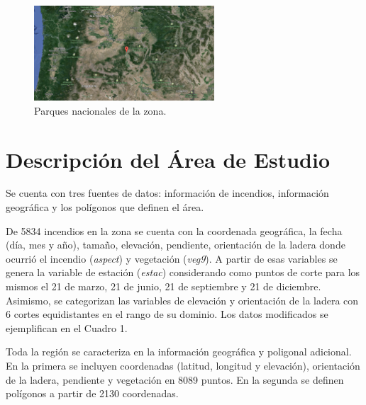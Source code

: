 \documentclass[12,]{article}
\begin{document}
\begin{figure}[H]
\centering
\includegraphics[width=0.6\textwidth]{imagenes/blueM.png}
\caption{Parques nacionales de la zona.}

\end{figure}

\section{Descripción del Área de
Estudio}\label{descripcion-del-area-de-estudio}

Se cuenta con tres fuentes de datos: información de incendios,
información geográfica y los polígonos que definen el área.

De 5834 incendios en la zona se cuenta con la coordenada geográfica, la
fecha (día, mes y año), tamaño, elevación, pendiente, orientación de la
ladera donde ocurrió el incendio (\emph{aspect}) y vegetación
(\emph{veg9}). A partir de esas variables se genera la variable de
estación (\emph{estac}) considerando como puntos de corte para los
mismos el 21 de marzo, 21 de junio, 21 de septiembre y 21 de diciembre.
Asimismo, se categorizan las variables de elevación y orientación de la
ladera con 6 cortes equidistantes en el rango de su dominio. Los datos
modificados se ejemplifican en el Cuadro 1.

Toda la región se caracteriza en la información geográfica y poligonal
adicional. En la primera se incluyen coordenadas (latitud, longitud y
elevación), orientación de la ladera, pendiente y vegetación en 8089
puntos. En la segunda se definen polígonos a partir de 2130 coordenadas.
\end{document}
